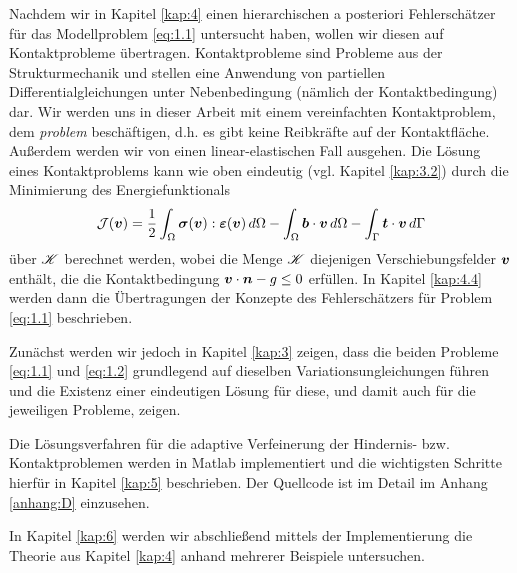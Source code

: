 Nachdem wir in Kapitel \ref{kap:4} einen hierarchischen a posteriori Fehlerschätzer für das Modellproblem \eqref{eq:1.1} untersucht haben, wollen wir diesen auf Kontaktprobleme übertragen. Kontaktprobleme sind Probleme aus der Strukturmechanik und stellen eine Anwendung von partiellen Differentialgleichungen unter Nebenbedingung (nämlich der Kontaktbedingung) dar. Wir werden uns in dieser Arbeit mit einem vereinfachten Kontaktproblem, dem \textit{problem} beschäftigen, d.h. es gibt keine Reibkräfte auf der Kontaktfläche. Außerdem werden wir von einen linear-elastischen Fall ausgehen. Die Lösung eines Kontaktproblems kann wie oben eindeutig (vgl. Kapitel \ref{kap:3.2}) durch die Minimierung des Energiefunktionals
\begin{align}\label{eq:1.2}
	\mathcal J (\boldsymbol v) = \frac 12 \int_\Omega \boldsymbol \sigma (\boldsymbol v):\boldsymbol {\varepsilon}(\boldsymbol v) \, d\Omega - \int_\Omega \boldsymbol b\cdot \boldsymbol v \, d\Omega - \int_{\Gamma} \boldsymbol t\cdot \boldsymbol v \, d\Gamma 
\end{align}
über $\mathscr K$ berechnet werden, wobei die Menge $\mathscr K$ diejenigen Verschiebungsfelder $\boldsymbol v$ enthält, die die Kontaktbedingung $\boldsymbol v \cdot\boldsymbol n - g \le 0$ erfüllen. In Kapitel \ref{kap:4.4} werden dann die Übertragungen der Konzepte des Fehlerschätzers für Problem \eqref{eq:1.1} beschrieben.

Zunächst werden wir jedoch in Kapitel \ref{kap:3} zeigen, dass die beiden Probleme \eqref{eq:1.1} und \eqref{eq:1.2} grundlegend auf dieselben Variationsungleichungen führen und die Existenz einer eindeutigen Lösung für diese, und damit auch für die jeweiligen Probleme, zeigen.


Die Lösungsverfahren für die adaptive Verfeinerung der Hindernis- bzw. Kontaktproblemen werden in Matlab implementiert und die wichtigsten Schritte hierfür in Kapitel \ref{kap:5} beschrieben. Der Quellcode ist im Detail im Anhang \ref{anhang:D} einzusehen.

In Kapitel \ref{kap:6} werden wir abschließend mittels der Implementierung die Theorie aus Kapitel \ref{kap:4} anhand mehrerer Beispiele untersuchen.

